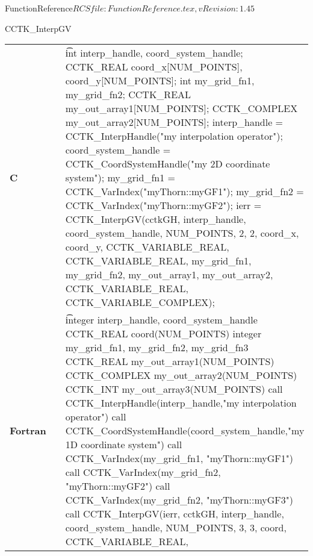 \begin{cactuspart}{5}{FunctionReference}{$RCSfile: FunctionReference.tex,v $}{$Revision: 1.45 $}
\begin{CCTKFunc}{CCTK\_InterpGV}
\begin{examples}
\begin{tabular}{@{}p{3cm}cp{11cm}}
\hfill {\bf C} && {\t
int interp\_handle, coord\_system\_handle;
CCTK\_REAL coord\_x[NUM\_POINTS], coord\_y[NUM\_POINTS];
int my\_grid\_fn1,  my\_grid\_fn2;
CCTK\_REAL my\_out\_array1[NUM\_POINTS];
CCTK\_COMPLEX  my\_out\_array2[NUM\_POINTS];\linebreak
interp\_handle =\vfill
\hspace{2ex} CCTK\_InterpHandle("my interpolation operator");
coord\_system\_handle =\vfill
\hspace{2ex} CCTK\_CoordSystemHandle("my 2D coordinate system");
my\_grid\_fn1 = CCTK\_VarIndex("myThorn::myGF1");
my\_grid\_fn2 = CCTK\_VarIndex("myThorn::myGF2");\linebreak
ierr = CCTK\_InterpGV(cctkGH,\vfill
\hspace{2ex} interp\_handle, coord\_system\_handle,\vfill
\hspace{2ex} NUM\_POINTS, 2, 2,\vfill
\hspace{2ex} coord\_x, coord\_y,\vfill
\hspace{2ex} CCTK\_VARIABLE\_REAL, CCTK\_VARIABLE\_REAL,\vfill
\hspace{2ex} my\_grid\_fn1,  my\_grid\_fn2,\vfill
\hspace{2ex} my\_out\_array1, my\_out\_array2,\vfill
\hspace{2ex} CCTK\_VARIABLE\_REAL, CCTK\_VARIABLE\_COMPLEX);
}
\\
\hfill {\bf Fortran} && {\t
integer interp\_handle, coord\_system\_handle
CCTK\_REAL coord(NUM\_POINTS)
integer my\_grid\_fn1,  my\_grid\_fn2, my\_grid\_fn3
CCTK\_REAL my\_out\_array1(NUM\_POINTS)
CCTK\_COMPLEX  my\_out\_array2(NUM\_POINTS)
CCTK\_INT my\_out\_array3(NUM\_POINTS)\linebreak
call CCTK\_InterpHandle(interp\_handle,\vfill\hspace{2ex}"my interpolation operator")
call CCTK\_CoordSystemHandle(coord\_system\_handle,\vfill\hspace{2ex}"my 1D coordinate system")
call CCTK\_VarIndex(my\_grid\_fn1, "myThorn::myGF1")
call CCTK\_VarIndex(my\_grid\_fn2, "myThorn::myGF2")
call CCTK\_VarIndex(my\_grid\_fn2, "myThorn::myGF3")\linebreak
call CCTK\_InterpGV(ierr, cctkGH,\vfill
\hspace{2ex} interp\_handle, coord\_system\_handle,\vfill
\hspace{2ex} NUM\_POINTS, 3, 3,\vfill
\hspace{2ex} coord,\vfill
\hspace{2ex} CCTK\_VARIABLE\_REAL,\vfill
}
\end{tabular}
\end{examples}
\end{CCTKFunc}
\end{cactuspart}
